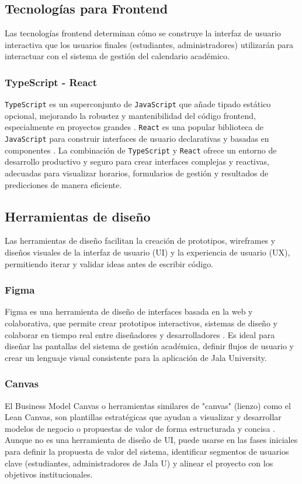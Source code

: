 \subsection{Tecnologías para Frontend}
Las tecnologías frontend determinan cómo se construye la interfaz de usuario interactiva que los usuarios finales (estudiantes, administradores) utilizarán para interactuar con el sistema de gestión del calendario académico.

\subsubsection{TypeScript - React}
\texttt{TypeScript} es un superconjunto de \texttt{JavaScript} que añade tipado estático opcional, mejorando la robustez y mantenibilidad del código frontend, especialmente en proyectos grandes \parencite{MicrosoftTypeScript}. \texttt{React} es una popular biblioteca de \texttt{JavaScript} para construir interfaces de usuario declarativas y basadas en componentes \parencite{FacebookReact}.
La combinación de \texttt{TypeScript} y \texttt{React} ofrece un entorno de desarrollo productivo y seguro para crear interfaces complejas y reactivas, adecuadas para visualizar horarios, formularios de gestión y resultados de predicciones de manera eficiente.

\subsection{Herramientas de diseño}
Las herramientas de diseño facilitan la creación de prototipos, wireframes y diseños visuales de la interfaz de usuario (UI) y la experiencia de usuario (UX), permitiendo iterar y validar ideas antes de escribir código.

\subsubsection{Figma}
Figma es una herramienta de diseño de interfaces basada en la web y colaborativa, que permite crear prototipos interactivos, sistemas de diseño y colaborar en tiempo real entre diseñadores y desarrolladores \parencite{Figma}.
Es ideal para diseñar las pantallas del sistema de gestión académica, definir flujos de usuario y crear un lenguaje visual consistente para la aplicación de Jala University.

\subsubsection{Canvas}
El Business Model Canvas o herramientas similares de "canvas" (lienzo) como el Lean Canvas, son plantillas estratégicas que ayudan a visualizar y desarrollar modelos de negocio o propuestas de valor de forma estructurada y concisa \parencite{OsterwalderPigneur2010}.
Aunque no es una herramienta de diseño de UI, puede usarse en las fases iniciales para definir la propuesta de valor del sistema, identificar segmentos de usuarios clave (estudiantes, administradores de Jala U) y alinear el proyecto con los objetivos institucionales.

